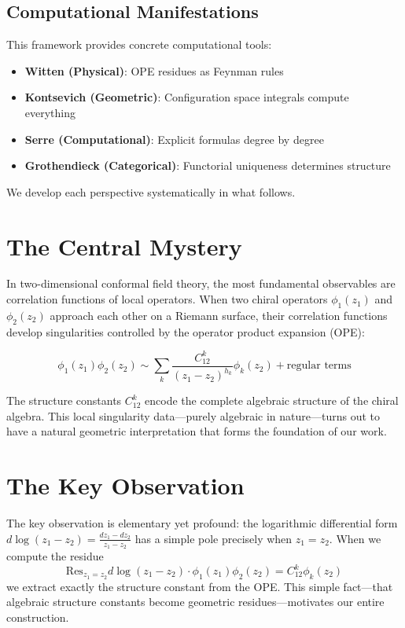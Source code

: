 \subsection{Computational Manifestations}

This framework provides concrete computational tools:

\begin{itemize}
\item \textbf{Witten (Physical)}: OPE residues as Feynman rules
\item \textbf{Kontsevich (Geometric)}: Configuration space integrals compute everything
\item \textbf{Serre (Computational)}: Explicit formulas degree by degree
\item \textbf{Grothendieck (Categorical)}: Functorial uniqueness determines structure
\end{itemize}

We develop each perspective systematically in what follows.

\section{The Central Mystery}

In two-dimensional conformal field theory, the most fundamental observables are correlation functions of local operators. When two chiral operators $\phi_1(z_1)$ and $\phi_2(z_2)$ approach each other on a Riemann surface, their correlation functions develop singularities controlled by the operator product expansion (OPE):

$$\phi_1(z_1) \phi_2(z_2) \sim \sum_k \frac{C^k_{12}}{(z_1 - z_2)^{h_k}} \phi_k(z_2) + \text{regular terms}$$

The structure constants $C^k_{12}$ encode the complete algebraic structure of the chiral algebra. This local singularity data—purely algebraic in nature—turns out to have a natural geometric interpretation that forms the foundation of our work.

\section{The Key Observation}

The key observation is elementary yet profound: the logarithmic differential form $d\log(z_1 - z_2) = \frac{dz_1 - dz_2}{z_1 - z_2}$ has a simple pole precisely when $z_1 = z_2$. When we compute the residue
$$\text{Res}_{z_1=z_2} d\log(z_1 - z_2) \cdot \phi_1(z_1)\phi_2(z_2) = C^k_{12} \phi_k(z_2)$$
we extract exactly the structure constant from the OPE. This simple fact—that algebraic structure constants become geometric residues—motivates our entire construction.


